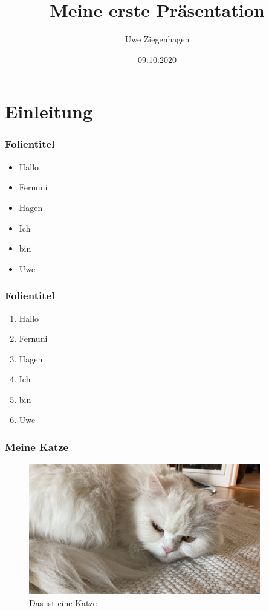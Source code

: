\documentclass[ngerman]{beamer}
\author{Uwe Ziegenhagen}
\title{Meine erste Präsentation}
\institute{Fernuni Hagen, Lehrstuhl Informatik}
\date{09.10.2020}
\begin{document}
\begin{frame}

\maketitle
	
\end{frame}

\begin{frame}
	
\tableofcontents
	
\end{frame}

\section{Einleitung}

\begin{frame}
	\frametitle{Folientitel}
	
	\begin{itemize}
		\item Hallo
		\item Fernuni
		\item Hagen
		\item Ich 
		\item bin 
		\item Uwe
	\end{itemize}

\end{frame}
	
\begin{frame}
	\frametitle{Folientitel}
	
	\begin{enumerate}
		\item Hallo
		\item Fernuni
		\item Hagen
		\item Ich 
		\item bin 
		\item Uwe
	\end{enumerate}
	
\end{frame}

\begin{frame}
	\frametitle{Meine Katze}
	
\begin{figure}[htb]
	\centering
	\includegraphics[width=0.9\textwidth]{./Bilder/miau.jpg}
	\caption{Das ist eine Katze}\label{fig:mieze}
\end{figure}
	
\end{frame}
\end{document}
